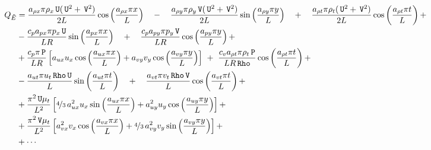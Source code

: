 \documentclass[10pt]{article}
\newcommand{\Rho}{\,\mathtt{Rho}}
\newcommand{\PP}{\,\mathtt{P}}
\newcommand{\U}{\,\mathtt{U}}
\newcommand{\V}{\,\mathtt{V}}
\newcommand{\tE}{\tilde{E}}
\begin{document}
\begin{equation*}
 \begin{split}
Q_{\tE}&= \dfrac{ a_{\rho x} \pi \rho_x \U(\U^2+\V^2) }{2L}\cos\left(\dfrac{a_{\rho x} \pi x}{L}\right)\quad -\quad \dfrac{ a_{\rho y} \pi \rho_y \V(\U^2+ \V^2) }{2L}\sin\left(\dfrac{a_{\rho y} \pi y}{L}\right)\quad +\quad \dfrac{a_{\rho t} \pi \rho_t (\U^2+\V^2) }{2L}\cos\left(\dfrac{a_{\rho t} \pi t}{L}\right)+\\
&-\dfrac{c_p a_{px} \pi p_x \U }{LR}\sin\left(\dfrac{a_{px} \pi x}{L}\right)\quad+\quad\dfrac{c_p a_{py} \pi p_y \V }{LR}\cos\left(\dfrac{a_{py} \pi y}{L}\right)+\\
&+\dfrac{c_p \pi \PP}{LR}\left[a_{ux} u_x \cos\left(\dfrac{a_{ux} \pi x}{L}\right)+a_{vy} v_y \cos\left(\dfrac{a_{vy} \pi y}{L}\right)\right] \,\,+\,\,\dfrac{c_v a_{\rho t} \pi \rho_t \PP }{L R \Rho}\cos\left(\dfrac{a_{\rho t} \pi t}{L}\right) +\\
&-\dfrac{a_{ut} \pi u_t \Rho \U }{L}\sin\left(\dfrac{a_{ut} \pi t}{L}\right)\quad+\quad\dfrac{a_{vt} \pi v_t \Rho \V }{L}\cos\left(\dfrac{a_{vt} \pi t}{L}\right)+\\
&+ \dfrac{\pi^2  \U \mu_t}{L^2}\left[\nicefrac{4}{3}\, a_{ux}^2 u_x \sin\left(\dfrac{a_{ux} \pi x}{L}\right)+a_{uy}^2 u_y \cos\left(\dfrac{a_{uy} \pi y}{L}\right)\right]+\\
&+\dfrac{\pi^2  \V \mu_t}{L^2}\left[a_{vx}^2 v_x \cos\left(\dfrac{a_{vx} \pi x}{L}\right)+\nicefrac{4}{3}\, a_{vy}^2 v_y \sin\left(\dfrac{a_{vy} \pi y}{L}\right)\right] +\\
&+\cdots
 \end{split}
\end{equation*}
\end{document}
